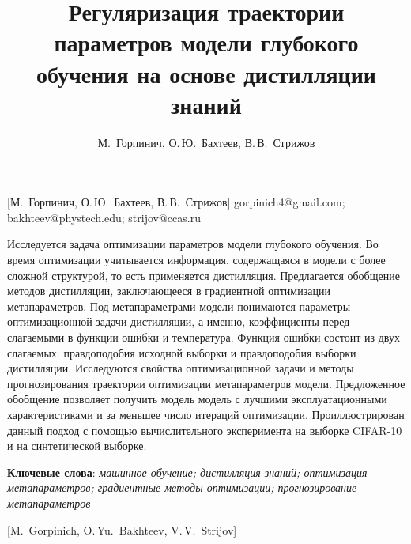 \documentclass[12pt, twoside]{article}
\begin{document}
\title
    [Оптимизация параметров модели на основе дистилляции знаний] %
    {Регуляризация траектории параметров модели глубокого обучения на основе дистилляции знаний}
\author
    [М.~Горпинич] %
    {М.~Горпинич, О.\,Ю.~Бахтеев, В.\,В.~Стрижов} %
    [М.~Горпинич, О.\,Ю.~Бахтеев, В.\,В.~Стрижов] %
\email
    {gorpinich4@gmail.com; bakhteev@phystech.edu;  strijov@ccas.ru}
\abstract
    {Исследуется задача оптимизации параметров модели глубокого обучения. Во время оптимизации учитывается информация, содержащаяся в модели с более сложной структурой, то есть применяется дистилляция. Предлагается обобщение методов дистилляции, заключающееся в градиентной оптимизации метапараметров. Под метапараметрами модели понимаются параметры оптимизационной задачи дистилляции, а именно, коэффициенты перед слагаемыми в функции ошибки и температура. Функция ошибки состоит из двух слагаемых: правдоподобия исходной выборки и правдоподобия выборки дистилляции. Исследуются свойства оптимизационной задачи и методы прогнозирования траектории оптимизации метапараметров модели. Предложенное обобщение позволяет получить модель модель с лучшими эксплуатационными характеристиками и за меньшее число итераций оптимизации. Проиллюстрирован данный подход с помощью вычислительного эксперимента на выборке CIFAR-10 и на синтетической выборке.
	
\bigskip
\noindent
\textbf{Ключевые слова}: \emph {машинное обучение; дистилляция знаний; оптимизация метапараметров; градиентные методы оптимизации; прогнозирование метапараметров}
}

    [M.~Gorpinich, O.\,Yu.~Bakhteev, V.\,V.~Strijov] %
\end{document}
